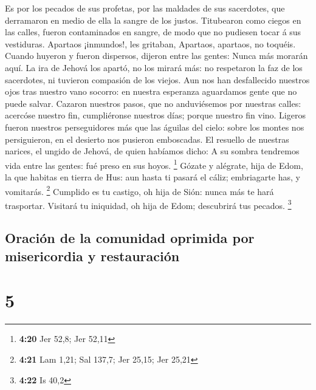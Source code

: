  Es por los pecados de sus profetas, por las maldades de
sus sacerdotes, que derramaron en medio de ella la sangre de los justos.
 Titubearon como ciegos en las calles, fueron contaminados
en sangre, de modo que no pudiesen tocar á sus vestiduras. 
Apartaos ¡inmundos!, les gritaban, Apartaos, apartaos, no toquéis.
Cuando huyeron y fueron dispersos, dijeron entre las gentes: Nunca más
morarán aquí.  La ira de Jehová los apartó, no los mirará
más: no respetaron la faz de los sacerdotes, ni tuvieron compasión de
los viejos.  Aun nos han desfallecido nuestros ojos tras
nuestro vano socorro: en nuestra esperanza aguardamos gente que no puede
salvar.  Cazaron nuestros pasos, que no anduviésemos por
nuestras calles: acercóse nuestro fin, cumpliéronse nuestros días;
porque nuestro fin vino.  Ligeros fueron nuestros
perseguidores más que las águilas del cielo: sobre los montes nos
persiguieron, en el desierto nos pusieron emboscadas.  El
resuello de nuestras narices, el ungido de Jehová, de quien habíamos
dicho: A su sombra tendremos vida entre las gentes: fué preso en sus
hoyos. \footnote{\textbf{4:20} Jer 52,8; Jer 52,11}  Gózate
y alégrate, hija de Edom, la que habitas en tierra de Hus: aun hasta ti
pasará el cáliz; embriagarte has, y vomitarás. \footnote{\textbf{4:21}
  Lam 1,21; Sal 137,7; Jer 25,15; Jer 25,21}  Cumplido es
tu castigo, oh hija de Sión: nunca más te hará trasportar. Visitará tu
iniquidad, oh hija de Edom; descubrirá tus pecados. \footnote{\textbf{4:22}
  Is 40,2}

\hypertarget{oraciuxf3n-de-la-comunidad-oprimida-por-misericordia-y-restauraciuxf3n}{%
\subsection{Oración de la comunidad oprimida por misericordia y
restauración}\label{oraciuxf3n-de-la-comunidad-oprimida-por-misericordia-y-restauraciuxf3n}}

\hypertarget{section-4}{%
\section{5}\label{section-4}}

